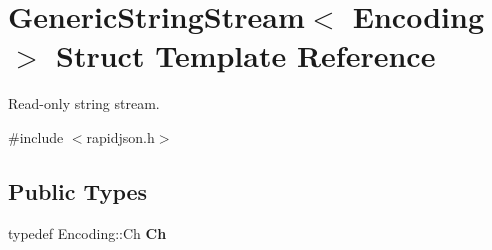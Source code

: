 \hypertarget{struct_generic_string_stream}{}\section{Generic\+String\+Stream$<$ Encoding $>$ Struct Template Reference}
\label{struct_generic_string_stream}


Read-\/only string stream.  




{\ttfamily \#include $<$rapidjson.\+h$>$}

\subsection*{Public Types}
\begin{DoxyCompactItemize}
\item 
typedef Encoding\+::\+Ch {\bfseries Ch}\hypertarget{struct_generic_string_stream_a4289aca895330084ff3168e37e4f08bd}{}\label{struct_generic_string_stream_a4289aca895330084ff3168e37e4f08bd}

\end{DoxyCompactItemize}
